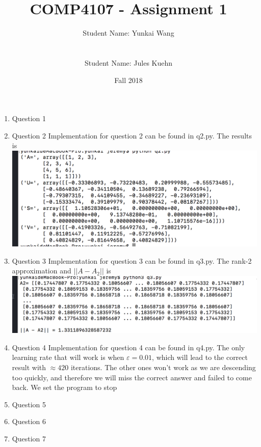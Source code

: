 \documentclass[11pt]{article}
\title{COMP4107 - Assignment 1}
\author{Student Name: Yunkai Wang\\
\text{Student Number: 100968473}\\\\
Student Name: Jules Kuehn\\
\text{Student Number: 100661464}}
\date{Fall 2018}
\begin{document}
\maketitle
\begin{enumerate}

\item Question 1

\item Question 2\newline
Implementation for question 2 can be found in q2.py. The results is\\
\includegraphics{q2_result}

\item Question 3\newline
Implementation for question 3 can be found in q3.py. The rank-2 approximation and $||A-A_2||$ is\\
\includegraphics{q3_result}

\item Question 4\newline
Implementation for question 4 can be found in q4.py. The only learning rate that will work is when $ε = 0.01$, which will lead to the correct result with $\approx 420$ iterations. The other ones won't work as we are descending too quickly, and therefore we will miss the correct answer and failed to come back. We set the program to stop

\item Question 5\newline

\item Question 6\newline

\item Question 7\newline

\end{enumerate}
\end{document}

